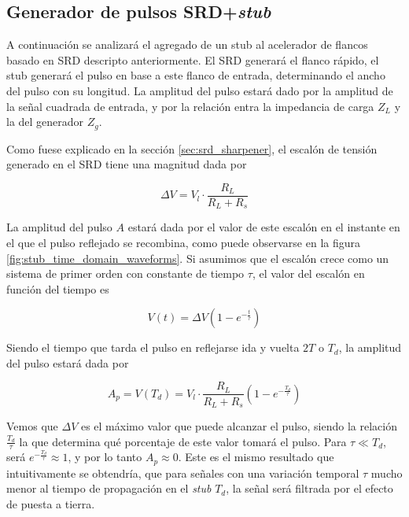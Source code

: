 \subsection{Generador de pulsos SRD+\textit{stub}}

A continuación se analizará el agregado de un stub al acelerador de flancos
basado en SRD descripto anteriormente. El SRD generará el flanco rápido, el stub
generará el pulso en base a este flanco de entrada, determinando el ancho del
pulso con su longitud. La amplitud del pulso estará dado por la amplitud de la
señal cuadrada de entrada, y por la relación entra la impedancia de carga $Z_L$
y la del generador $Z_g$.

Como fuese explicado en la sección \ref{sec:srd_sharpener}, el escalón de
tensión generado en el SRD tiene una magnitud dada por

\begin{equation}
    \Delta V = V_l \cdot \frac{R_L}{R_L+R_s}
\end{equation}

La amplitud del pulso $A$ estará dada por el valor de este escalón en el instante en
el que el pulso reflejado se recombina, como puede observarse en la figura
\ref{fig:stub_time_domain_waveforms}. Si asumimos que el escalón
crece como un sistema de primer orden con constante de tiempo $\tau$, el valor
del escalón en función del tiempo es

\begin{equation}
  V(t) = \Delta V \left( 1-e^{-\frac{t}{\tau}}\right)
\end{equation}

Siendo el tiempo que tarda el pulso en reflejarse ida y vuelta $2T$ o $T_d$, la
amplitud del pulso estará dada por

\begin{equation}
    \label{eq:A_p}
    A_p = V(T_d) = V_l \cdot \frac{R_L}{R_L+R_s} \left( 1-e^{-\frac{T_d}{\tau}}\right)
\end{equation}

Vemos que $\Delta V$ es el máximo valor que puede alcanzar el pulso, siendo la
relación $\frac{T_d}{\tau}$ la que determina qué porcentaje de este valor tomará
el pulso. Para $ \tau \ll T_d $, será $e^{-\frac{T_d}{\tau}} \approx 1$, y por lo
tanto $A_p \approx 0$. Este es el mismo resultado que intuitivamente se
obtendría, que para señales con una variación temporal $\tau$ mucho menor al
tiempo de propagación en el \textit{stub} $T_d$, la señal será filtrada por el
efecto de puesta a tierra.

